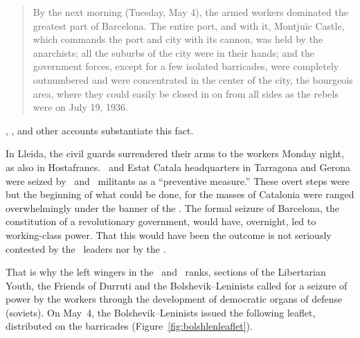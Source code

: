 \begin{quotation}
  By the next morning (Tuesday, May 4), the armed workers dominated the greatest part of Barcelona. The entire port, and with it, Montjuïc Castle, which commands the port and city with its cannon, was held by the anarchists; all the suburbs of the city were in their hands; and the government forces, except for a few isolated barricades, were completely outnumbered and were concentrated in the center of the city, the bourgeois area, where they could easily be closed in on from all sides as the rebels were on July 19, 1936.
\end{quotation}

\CNT, \POUM, and other accounts substantiate this fact.

\smallskip

In Lleida, the civil guards surrendered their arms to the workers Monday night, as also in Hostafrancs. \PSUC\ and Estat Catala headquarters in Tarragona and Gerona were seized by \POUM\ and \CNT\ militants as a ``preventive measure.'' These overt steps were but the beginning of what could be done, for the masses of Catalonia were ranged overwhelmingly under the banner of the \CNT\kn. The formal seizure of Barcelona, the constitution of a revolutionary government, would have, overnight, led to working-class power. That this would have been the outcome is not seriously contested by the \CNT\ leaders nor by the \POUM.

That is why the left wingers in the \CNT\ and \POUM\ ranks, sections of the Libertarian Youth, the Friends of Durruti and the Bolshevik--Leninists called for a seizure of power by the workers through the development of democratic organs of defense (soviets). On May~4, the Bolshevik--Leninists issued the following leaflet, distributed on the barricades (Figure~\ref{fig:bolshlenleaflet}).

